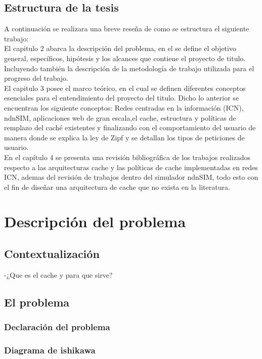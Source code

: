 \documentclass[12pt]{ociamthesis}  %
\begin{document}
\section{Estructura de la tesis}
A continuación se realizara una breve reseña de como se estructura el siguiente trabajo:\\

El capitulo 2 abarca la descripción del problema, en el se define el objetivo general, específicos, hipótesis y los alcances que contiene el proyecto de titulo. Incluyendo también la descripción de la metodología de trabajo utilizada para el progreso del trabajo.\\

El capitulo 3 posee el marco teórico, en el cual se definen diferentes conceptos esenciales para el entendimiento del proyecto del titulo. Dicho lo anterior se encuentran los siguiente conceptos: Redes centradas en la información (ICN), ndnSIM, aplicaciones web de gran escala,el cache, estructura y políticas de remplazo del caché existentes y finalizando con el comportamiento del usuario de manera donde se explica la ley de Zipf y se detallan los tipos de peticiones de usuario.\\

En el capítulo 4 se presenta una revisión bibliográfica de los trabajos realizados respecto a las arquitecturas cache y las políticas de cache implementadas en redes ICN, ademas del revisión de trabajos dentro del simulador ndnSIM, todo esto con el fin de diseñar una arquitectura de cache que no exista en la literatura.\\

\chapter{Descripción del problema}

\section{Contextualización}
-¿Que es el cache y para que sirve?
\section{El problema}
\subsection{Declaración del problema}
\subsection{Diagrama de ishikawa}
\end{document}

